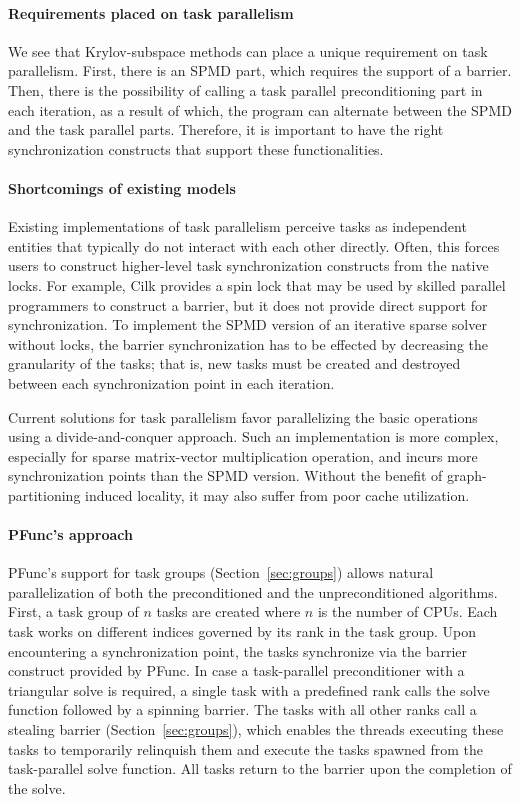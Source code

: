 \documentclass{sig-alternate}
\begin{document}
\paragraph{Requirements placed on task parallelism}
We see that Krylov-subspace methods can place a unique requirement on task
parallelism. First, there is an SPMD part, which requires the support of a
barrier.  Then, there is the possibility of calling a task parallel
preconditioning part in each iteration, as a result of which, the program can
alternate between the SPMD and the task parallel parts.  Therefore, it is
important to have the right synchronization constructs that support these
functionalities.

\paragraph{Shortcomings of existing models}
Existing implementations of task parallelism perceive tasks as independent
entities that typically do not interact with each other directly.  Often, this
forces users to construct higher-level task synchronization constructs from the
native locks.  For example, Cilk provides a spin lock that may be used by
skilled parallel programmers to construct a barrier, but it does not provide
direct support for synchronization.  To implement the SPMD version of an
iterative sparse solver without locks, the barrier synchronization has to be effected
by decreasing the granularity of the tasks; that is, new tasks must be created
and destroyed between each synchronization point in each iteration.

Current solutions for task parallelism favor parallelizing the basic
operations using a divide-and-conquer approach.  Such an implementation is
more complex, especially for sparse matrix-vector multiplication
operation, and incurs more synchronization points than the SPMD version.
Without the benefit of graph-partitioning induced
locality, it may also suffer from poor cache utilization.

\paragraph{PFunc's approach}
PFunc's support for task groups (Section~\ref{sec:groups}) allows natural
parallelization of both the preconditioned and the unpreconditioned algorithms.
First, a task group of $n$ tasks are created where $n$ is the number of CPUs.
Each task works on different indices governed by its rank in the task group.
Upon encountering a synchronization point, the tasks synchronize via the
barrier construct provided by PFunc.  In case a task-parallel preconditioner
with a triangular solve is required, a single task with a predefined rank calls the solve
function followed by a spinning barrier.  The tasks with all other ranks call a
stealing barrier (Section~\ref{sec:groups}), which enables the threads
executing these tasks to temporarily relinquish them and execute the tasks
spawned from the task-parallel solve function.  All tasks return to the barrier
upon the completion of the solve.
\end{document}
